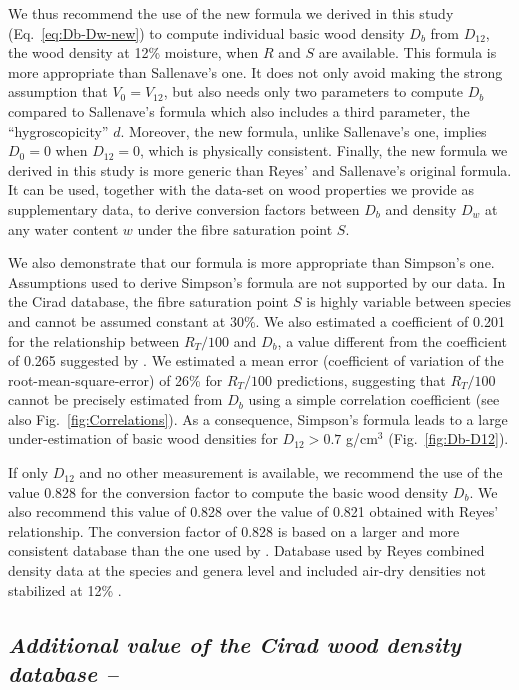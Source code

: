 \documentclass[a4paper, 12pt, leqno, dvipsnames]{article}\usepackage[]{graphicx}\usepackage[]{color}
\begin{document}
We thus recommend the use of the new formula we derived in this study (Eq.~\ref{eq:Db-Dw-new}) to compute individual basic wood density $D_{b}$ from $D_{12}$, the wood density at 12\% moisture, when $R$ and $S$ are available. This formula is more appropriate than Sallenave's one. It does not only avoid making the strong assumption that $V_0=V_{12}$, but also needs only two parameters to compute $D_b$ compared to Sallenave's formula which also includes a third parameter, the ``hygroscopicity'' $d$. Moreover, the new formula, unlike Sallenave's one, implies $D_0=0$ when $D_{12}=0$, which is physically consistent. Finally, the new formula we derived in this study is more generic than Reyes' and Sallenave's original formula. It can be used, together with the data-set on wood properties we provide as supplementary data, to derive conversion factors between $D_b$ and density $D_w$ at any water content $w$ under the fibre saturation point $S$.

We also demonstrate that our formula is more appropriate than Simpson's one. Assumptions used to derive Simpson's formula are not supported by our data. In the Cirad database, the fibre saturation point $S$ is highly variable between species and cannot be assumed constant at 30\%. We also estimated a coefficient of 0.201 for the relationship between $R_T/100$ and $D_b$, a value different from the coefficient of 0.265 suggested by \citet{Stamm1964}. We estimated a mean error (coefficient of variation of the root-mean-square-error) of 26\% for $R_T/100$ predictions, suggesting that $R_T/100$ cannot be precisely estimated from $D_b$ using a simple correlation coefficient (see also Fig.~\ref{fig:Correlations}). As a consequence, Simpson's formula leads to a large under-estimation of basic wood densities for $D_{12}>0.7$ g/cm$^3$ (Fig.~\ref{fig:Db-D12}).

If only $D_{12}$ and no other measurement is available, we recommend the use of the value 0.828 for the conversion factor to compute the basic wood density $D_b$. We also recommend this value of 0.828 over the value of 0.821 obtained with Reyes' relationship. The conversion factor of 0.828 is based on a larger and more consistent database than the one used by \citet{Reyes1992}. Database used by Reyes combined density data at the species and genera level and included air-dry densities not stabilized at 12\% \citep{Chudnoff1984}. 

\subsection*{\textit{Additional value of the Cirad wood density database --}}
\end{document}

